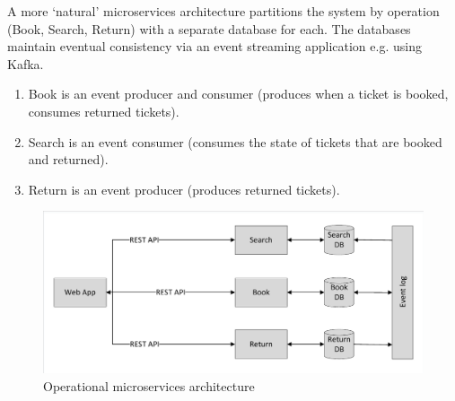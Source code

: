 \begin{shaded}
A more `natural' microservices architecture partitions the system by operation (Book, Search, Return) with a separate database for each.  The databases maintain eventual consistency via an event streaming application e.g. using Kafka.
\begin{enumerate}
\item Book is an event producer and consumer (produces when a ticket is booked, consumes returned tickets).
\item Search is an event consumer (consumes the state of tickets that are booked and returned).
\item Return is an event producer (produces returned tickets).
\end{enumerate}

\end{shaded}

\begin{figure}
	\caption{Operational microservices architecture}
	\centering
	\includegraphics[trim = 5 5 5 5, clip, width=\textwidth]{img/operationmicro}
\end{figure}

